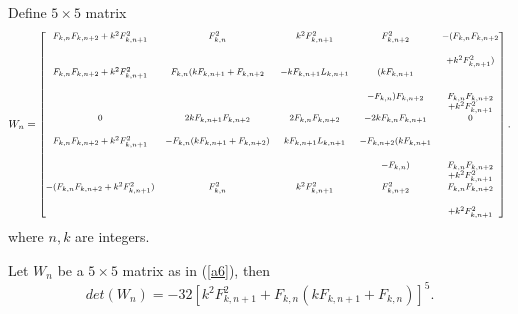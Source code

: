 \begin{definition}\label{a6}
Define $5 \times 5$ matrix 
\begin{align*}
\begin{footnotesize}
W_n = \begin{bmatrix}
           \bigskip
            F_{k,n}F_{k,n+2}+k^2 F_{k,n+1}^2 & F_{k,n}^2& k^2 F_{k,n+1}^2& F_{k,n+2}^2 & -(F_{k,n}F_{k,n+2}\\&&&&+k^2 F_{k,n+1}^2) \\
             \bigskip
            F_{k,n}F_{k,n+2}+k^2 F_{k,n+1}^2  & F_{k,n}(k F_{k,n+1}+F_{k,n+2} & -k F_{k,n+1}L_{k,n+1} & (k F_{k,n+1}\\&&&-F_{k,n}) F_{k,n+2}& F_{k,n}F_{k,n+2}\\&&&&+k^2 F_{k,n+1}^2 \\
             \bigskip
            0 & 2k F_{k,n+1}F_{k,n+2}& 2 F_{k,n}F_{k,n+2} & -2k F_{k,n}F_{k,n+1}& 0 \\
            \bigskip
            F_{k,n}F_{k,n+2}+k^2 F_{k,n+1}^2  & - F_{k,n}(k F_{k,n+1}+F_{k,n+2}) &k F_{k,n+1}L_{k,n+1}& - F_{k,n+2} (kF_{k,n+1}\\&&&- F_{k,n})& F_{k,n}F_{k,n+2}\\&&&&+k^2F_{k,n+1}^2 \\
     \bigskip
            -(F_{k,n}F_{k,n+2}+k^2 F_{k,n+1}^2)  &  F_{k,n}^2 & k^2 F_{k,n+1}^2 &  F_{k,n+2}^2& F_{k,n}F_{k,n+2}\\&&&&+k^2F_{k,n+1}^2        
\end{bmatrix}.
\end{footnotesize}
\end{align*}
where  $n, k$ are integers.
\end{definition}
\begin{theorem}
Let $W_n$ be a $5 \times 5$ matrix as in (\ref{a6}), then
\begin{equation}
det(W_n) = -32 \left[ k^2 F_{k, n+1}^2 + F_{k, n}(k F_{k, n+1}+F_{k, n})\right] ^5.
\end{equation}
\end{theorem}
